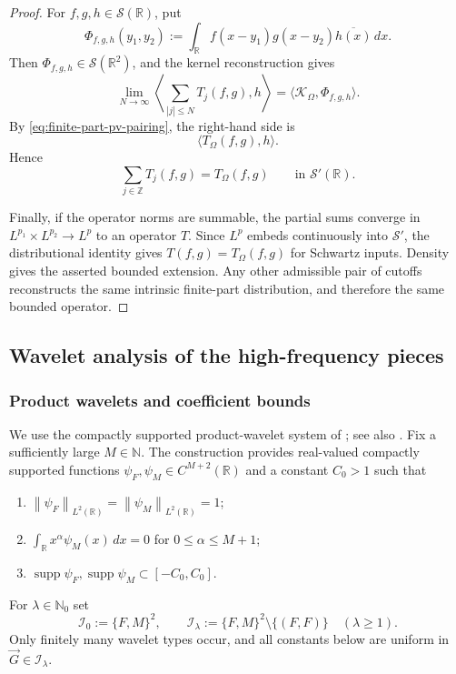 \documentclass[11pt]{amsart}
\theoremstyle{remark}
\numberwithin{equation}{section}
\newcommand{\R}{\mathbb R}
\newcommand{\N}{\mathbb N}
\newcommand{\cI}{\mathcal I}
\newcommand{\norm}[1]{\left\lVert #1\right\rVert}
\newcommand{\supp}{\operatorname{supp}}
\begin{document}
\begin{proof}
		For \(f,g,h\in\mathcal S(\R)\), put
		\[
		\Phi_{f,g,h}(y_1,y_2)
		:=\int_\R f(x-y_1)g(x-y_2)\overline{h(x)}\,dx.
		\]
		Then \(\Phi_{f,g,h}\in\mathcal S(\R^2)\), and the kernel reconstruction gives
		\[
		\lim_{N\to\infty}
		\left\langle\sum_{|j|\le N}T_j(f,g),h\right\rangle
		=\langle\mathcal K_\Omega,\Phi_{f,g,h}\rangle.
		\]
		By \eqref{eq:finite-part-pv-pairing}, the right-hand side is
		\[
		\langle T_\Omega(f,g),h\rangle.
		\]
		Hence
		\[
		\sum_{j\in\mathbb Z}T_j(f,g)=T_\Omega(f,g)
		\qquad\text{in }\mathcal S'(\R).
		\]
		
		Finally, if the operator norms are summable, the partial sums converge in
		\(L^{p_1}\times L^{p_2}\to L^p\) to an operator \(T\). Since \(L^p\)
		embeds continuously into \(\mathcal S'\), the distributional identity gives
		\(T(f,g)=T_\Omega(f,g)\) for Schwartz inputs. Density gives the asserted
		bounded extension. Any other admissible pair of cutoffs reconstructs the
		same intrinsic finite-part distribution, and therefore the same bounded
		operator.
	\end{proof}
	
	\subsection{Wavelet analysis of the high-frequency pieces}
	
	\subsubsection{Product wavelets and coefficient bounds}
	
	We use the compactly supported product-wavelet system of
	\cite{GrafakosHeHonzikPark2023}; see also
	\cite{Daubechies_1988,Meyer_1992}.  Fix a sufficiently large \(M\in\N\).
	The construction provides real-valued compactly supported functions
	\(\psi_F,\psi_M\in C^{M+2}(\R)\) and a constant \(C_0>1\) such that
	\begin{enumerate}
		\item \(\norm{\psi_F}_{L^2(\R)}=\norm{\psi_M}_{L^2(\R)}=1\);
		\item \(\int_\R x^\alpha\psi_M(x)\,dx=0\) for \(0\le \alpha\le M+1\);
		\item \(\supp\psi_F,\supp\psi_M\subset[-C_0,C_0]\).
	\end{enumerate}
	For \(\lambda\in\mathbb N_0\) set
	\[
	\cI_0:=\{F,M\}^2,
	\qquad
	\cI_\lambda:=\{F,M\}^2\setminus\{(F,F)\}\quad (\lambda\ge1).
	\]
	Only finitely many wavelet types occur, and all constants below are uniform in
	\(\vec G\in\cI_\lambda\).
	
\end{document}
